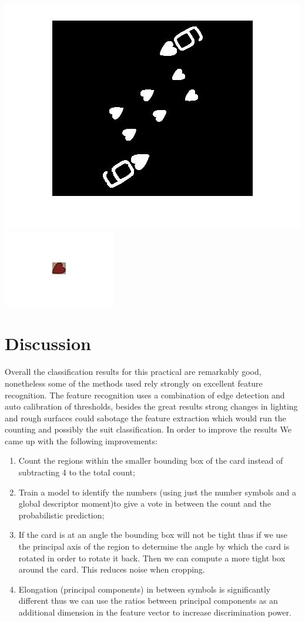 \documentclass[11pt]{article}
\theoremstyle{plain}
\theoremstyle{definition}
\begin{document}
  \includegraphics[scale=0.2]{rotate_works.jpg}
  \includegraphics[scale=0.4]{rotate2.jpg}

  \section{Discussion}
  Overall the classification results for this practical are remarkably good, nonetheless some of the methods used rely strongly on excellent feature recognition. The feature recognition uses a combination of edge detection and auto calibration of thresholds, besides the great results strong changes in lighting and rough surfaces could sabotage the feature extraction which would run the counting and possibly the suit classification. In order to improve the results We came up with the following improvements:
  \begin{enumerate}
  \item Count the regions within the smaller bounding box of the card instead of subtracting 4 to the total count;
  \item Train a model to identify the numbers (using just the number symbols and a global descriptor moment)to give a vote in between the count and the probabilistic prediction;
  \item If the card is at an angle the bounding box will not be tight thus if we use the principal axis of the region to determine the angle by which the card is rotated in order to rotate it back. Then we can compute a more tight box around the card.
  This reduces noise when cropping.
  \item Elongation (principal components) in between symbols is significantly different thus we can use the ratios between principal components as an additional dimension in the feature vector to increase discrimination power.
  \end{enumerate}
\end{document}
